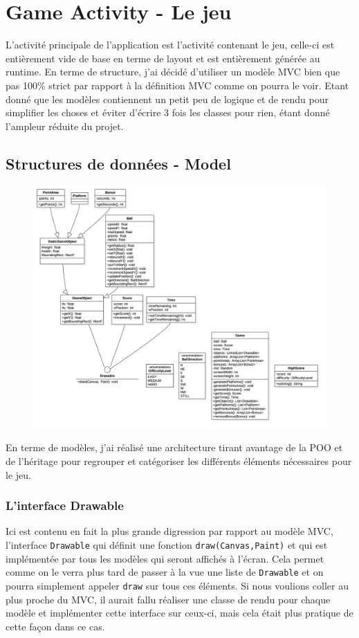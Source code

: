 \documentclass{article}
\begin{document}
\section{Game Activity - Le jeu}
L'activité principale de l'application est l'activité contenant le jeu, celle-ci est entièrement vide de base en terme de layout et est entièrement générée au runtime. En terme de structure, j'ai décidé d'utiliser un modèle MVC bien que pas 100\% strict par rapport à la définition MVC comme on pourra le voir. Etant donné que les modèles contiennent un petit peu de logique et de rendu pour simplifier les choses et éviter d'écrire 3 fois les classes pour rien, étant donné l'ampleur réduite du projet.
\subsection{Structures de données - Model}
\begin{figure}[H]
    \centering
	\includegraphics[width=\textwidth]{BallDroid_UML.png}
\end{figure}
En terme de modèles, j'ai réalisé une architecture tirant avantage de la POO et de l'héritage pour regrouper et catégoriser les différents éléments nécessaires pour le jeu.
\subsubsection{L'interface Drawable}
Ici est contenu en fait la plus grande digression par rapport au modèle MVC, l'interface \verb+Drawable+ qui définit une fonction \verb+draw(Canvas,Paint)+ et qui est implémentée par tous les modèles qui seront affichés à l'écran. Cela permet comme on le verra plus tard de passer à la vue une liste de \verb+Drawable+ et on pourra simplement appeler \verb+draw+ sur tous ces éléments. Si nous voulions coller au plus proche du MVC, il aurait fallu réaliser une classe de rendu pour chaque modèle et implémenter cette interface sur ceux-ci, mais cela était plus pratique de cette façon dans ce cas.
\end{document}
